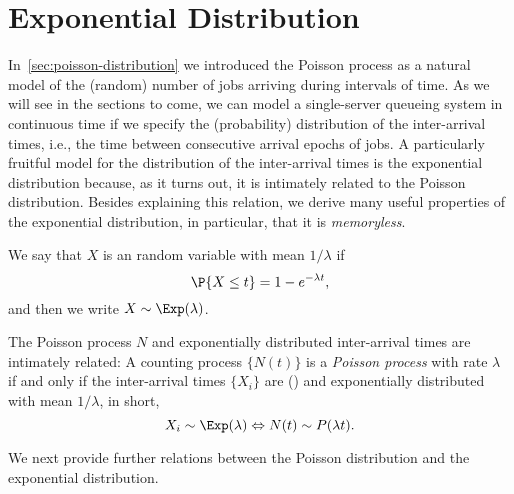 \section{Exponential Distribution}
\label{sec:expon-distr}




In~\cref{sec:poisson-distribution} we introduced the Poisson process as a natural model of the (random) number of jobs arriving during intervals of time.
As we will see in the sections to come, we can model a single-server queueing system in continuous time if we specify the (probability) distribution of the inter-arrival times, i.e., the time between consecutive arrival epochs of jobs.
A particularly fruitful model for the distribution of the inter-arrival times is the exponential distribution because, as it turns out, it is intimately related to the Poisson distribution.
Besides explaining this relation, we derive many useful properties of the exponential distribution, in particular, that it is \emph{memoryless}.

We say that $X$ is an  random variable with mean $1/\lambda$ if 
\begin{equation*}
 \P{X \leq t} = 1- e^{-\lambda t},
\end{equation*}
and then we write $X\sim \Exp(\lambda)$.


The Poisson process $N$ and exponentially distributed inter-arrival times are intimately related: A counting process $\{N(t)\}$ is a \emph{Poisson process} with rate $\lambda$ if and only if the inter-arrival times $\{X_i\}$ are  () and exponentially distributed with mean $1/\lambda$, in short, 
\begin{equation*}
X_i\sim \Exp(\lambda) \Leftrightarrow N(t) \sim P(\lambda t).
\end{equation*}


We next provide further relations between the Poisson distribution and the exponential distribution. 


